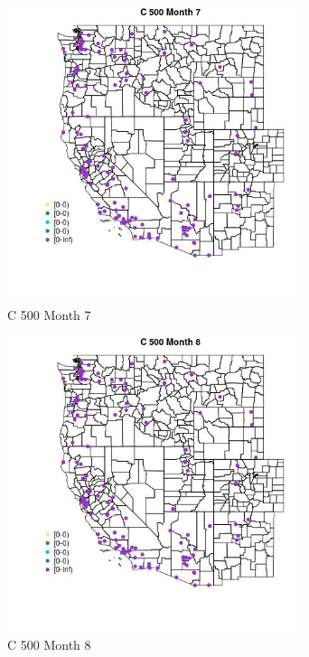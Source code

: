 \begin{figure} 
\centering  
\includegraphics[width=0.77\textwidth]{Code_Outputs/Report_ML_input_PM25_Step4_part_e_de_duplicated_aves_MapObsMo7C_500.jpg} 
\caption{\label{fig:Report_ML_input_PM25_Step4_part_e_de_duplicated_avesMapObsMo7C_500}C 500 Month 7} 
\end{figure} 
 

\begin{figure} 
\centering  
\includegraphics[width=0.77\textwidth]{Code_Outputs/Report_ML_input_PM25_Step4_part_e_de_duplicated_aves_MapObsMo8C_500.jpg} 
\caption{\label{fig:Report_ML_input_PM25_Step4_part_e_de_duplicated_avesMapObsMo8C_500}C 500 Month 8} 
\end{figure} 
 

